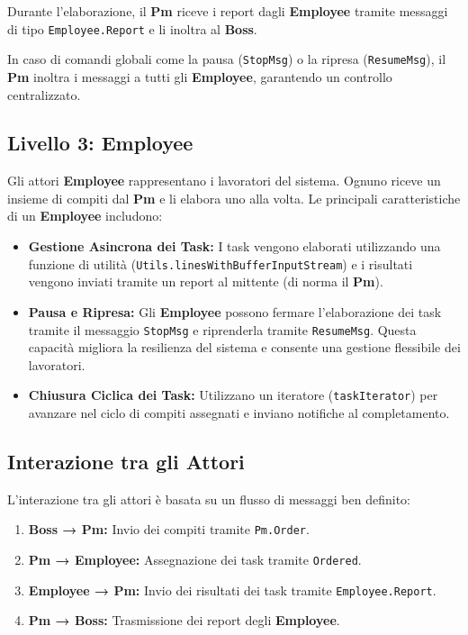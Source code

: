 Durante l'elaborazione, il \textbf{Pm} riceve i report dagli \textbf{Employee} tramite messaggi di tipo \texttt{Employee.Report} e li inoltra al \textbf{Boss}.  

In caso di comandi globali come la pausa (\texttt{StopMsg}) o la ripresa (\texttt{ResumeMsg}), il \textbf{Pm} inoltra i messaggi a tutti gli \textbf{Employee}, garantendo un controllo centralizzato.

\subsection{Livello 3: Employee}
Gli attori \textbf{Employee} rappresentano i lavoratori del sistema. Ognuno riceve un insieme di compiti dal \textbf{Pm} e li elabora uno alla volta. Le principali caratteristiche di un \textbf{Employee} includono:
\begin{itemize}
    \item \textbf{Gestione Asincrona dei Task:} I task vengono elaborati utilizzando una funzione di utilità (\texttt{Utils.linesWithBufferInputStream}) e i risultati vengono inviati tramite un report al mittente (di norma il \textbf{Pm}).
    \item \textbf{Pausa e Ripresa:} Gli \textbf{Employee} possono fermare l'elaborazione dei task tramite il messaggio \texttt{StopMsg} e riprenderla tramite \texttt{ResumeMsg}. Questa capacità migliora la resilienza del sistema e consente una gestione flessibile dei lavoratori.
    \item \textbf{Chiusura Ciclica dei Task:} Utilizzano un iteratore (\texttt{taskIterator}) per avanzare nel ciclo di compiti assegnati e inviano notifiche al completamento.
\end{itemize}

\subsection{Interazione tra gli Attori}
L'interazione tra gli attori è basata su un flusso di messaggi ben definito:
\begin{enumerate}
    \item \textbf{Boss → Pm:} Invio dei compiti tramite \texttt{Pm.Order}.
    \item \textbf{Pm → Employee:} Assegnazione dei task tramite \texttt{Ordered}.
    \item \textbf{Employee → Pm:} Invio dei risultati dei task tramite \texttt{Employee.Report}.
    \item \textbf{Pm → Boss:} Trasmissione dei report degli \textbf{Employee}.
\end{enumerate}


